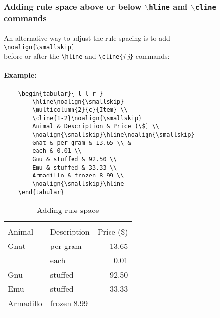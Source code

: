 \subsubsection[Adding rule space]{Adding rule space above or below \texttt{$\backslash$hline} and \texttt{$\backslash$cline} commands}

\paragraph{}
An alternative way to adjust the rule spacing is to add \\ \verb|\noalign{\smallskip}|
\\ before or after the \verb|\hline| and \verb|\cline{|\emph{i-j}\verb|}| commands:

\paragraph{Example:}
\begin{verbatim}
	\begin{tabular}{ l l r }
		\hline\noalign{\smallskip}
		\multicolumn{2}{c}{Item} \\
		\cline{1-2}\noalign{\smallskip}
		Animal & Description & Price (\$) \\
		\noalign{\smallskip}\hline\noalign{\smallskip}
		Gnat & per gram & 13.65 \\ &
		each & 0.01 \\
		Gnu & stuffed & 92.50 \\
		Emu & stuffed & 33.33 \\
		Armadillo & frozen 8.99 \\
		\noalign{\smallskip}\hline
	\end{tabular}
	\end{verbatim}

\begin{table}[htnp]
	\centering
	\begin{tabular}{ l l r }
		\hline\noalign{\smallskip}
		\multicolumn{2}{c}{Item} \\
		\cline{1-2}\noalign{\smallskip}
		Animal & Description & Price (\$) \\
		\noalign{\smallskip}\hline\noalign{\smallskip}
		Gnat & per gram & 13.65 \\ &
		each & 0.01 \\
		Gnu & stuffed & 92.50 \\
		Emu & stuffed & 33.33 \\
		Armadillo & frozen 8.99 \\
		\noalign{\smallskip}\hline
	\end{tabular}
	\caption{Adding rule space } %
	\label{addingrulespace}
\end{table}

